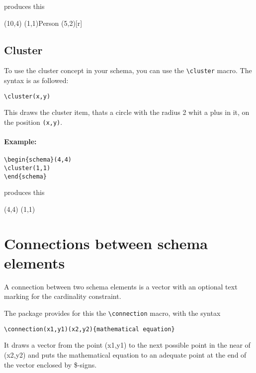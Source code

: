 \documentclass[a4paper,11pt]{article}
\begin{document}
produces this

\begin{schema}(10,4)
\entity(1,1){Person}
\attr(5,2)[r]{}
\end{schema}

\subsection{Cluster}

To use the cluster concept in your schema, you can use the \verb|\cluster| macro.
The syntax is as followed:

\begin{verbatim}
\cluster(x,y)
\end{verbatim}

This draws the cluster item, thats a circle with the radius 2 whit a plus in it, on the position 
{\tt (x,y)}.

\paragraph{Example:}

\begin{verbatim}
\begin{schema}(4,4)
\cluster(1,1)
\end{schema}

\end{verbatim}

produces this

\begin{schema}(4,4)
\cluster(1,1)
\end{schema}

\section{Connections between schema elements}

A connection between two schema elements is a vector with an optional
text marking for the cardinality constraint.

The package provides for this the \verb|\connection| macro, with the syntax

\begin{verbatim}
\connection(x1,y1)(x2,y2){mathematical equation}
\end{verbatim}

It draws a vector from the point (x1,y1) to the next possible point in the near
of (x2,y2) and puts the mathematical equation to an adequate point at the end of the 
vector enclosed by \$-signs. 
\end{document}
